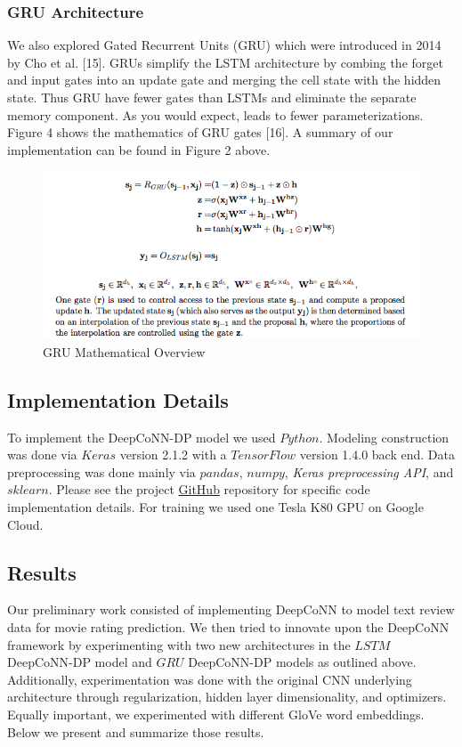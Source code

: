 \documentclass[10pt,twocolumn,letterpaper]{article}
\begin{document}
\subsubsection{GRU Architecture}
We also explored Gated Recurrent Units (GRU) which were introduced in 2014 by Cho et al. [15]. GRUs simplify the LSTM architecture by combing the forget and input gates into an update gate and merging the cell state with the
hidden state. Thus GRU have fewer gates than LSTMs and eliminate the separate memory component. As you would expect, leads to fewer parameterizations. Figure 4 shows the mathematics of GRU gates [16]. A summary of our implementation can be found in Figure 2 above.

\begin{figure}[!ht]
\includegraphics[scale=0.40]{GRU.png}
\caption{GRU Mathematical Overview}
\end{figure}

\subsection{Implementation Details}

To implement the DeepCoNN-DP model we used $Python$. Modeling construction was done via $Keras$ version 2.1.2 with a $TensorFlow$ version 1.4.0 back end. Data preprocessing was done mainly via $pandas$, $numpy$, \textit{Keras preprocessing API}, and $sklearn$. Please see the project \href{https://github.com/michaelAlvarino/Deep-Learning}{GitHub} repository for specific code implementation details. For training we used one Tesla K80 GPU on Google Cloud.

\subsection{Results}

Our preliminary work consisted of implementing DeepCoNN to model text review data for movie rating prediction. We then tried to innovate upon the DeepCoNN framework by experimenting with two new architectures in the $LSTM$ DeepCoNN-DP model and $GRU$ DeepCoNN-DP models as outlined above. Additionally, experimentation was done with the original CNN underlying architecture through regularization, hidden layer dimensionality, and optimizers. Equally important, we experimented with different GloVe word embeddings. Below we present and summarize those results.
\end{document}
